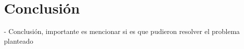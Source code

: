 \section{Conclusión}

- Conclusión, importante es mencionar si es que pudieron resolver el problema planteado
